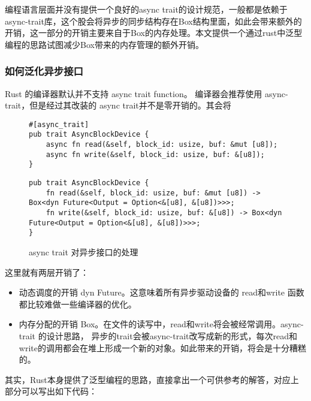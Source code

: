 编程语言层面并没有提供一个良好的async trait的设计规范，一般都是依赖于async-trait库，这个股会将异步的同步结构存在Box结构里面，如此会带来额外的开销，这一部分的开销主要来自于Box的内存处理。本文提供一个通过rust中泛型编程的思路试图减少Box带来的内存管理的额外开销。

\subsubsection*{如何泛化异步接口}

Rust 的编译器默认并不支持 async trait function。 编译器会推荐使用 async-trait，但是经过其改装的 async trait并不是零开销的。其会将


\begin{figure}[htbp]
    \figureCapSet
	\centering
	\begin{minipage}{0.49\linewidth}%
		\centering
        \begin{lstlisting}[frame=none]
#[async_trait]
pub trait AsyncBlockDevice {
    async fn read(&self, block_id: usize, buf: &mut [u8]);
    async fn write(&self, block_id: usize, buf: &[u8]);
}
        \end{lstlisting}
	\end{minipage}
    \hfill
	\begin{minipage}{0.49\linewidth}
		\centering
        \begin{lstlisting}[frame=none]
pub trait AsyncBlockDevice {
    fn read(&self, block_id: usize, buf: &mut [u8]) -> Box<dyn Future<Output = Option<&[u8], &[u8])>>>;
    fn write(&self, block_id: usize, buf: &[u8]) -> Box<dyn Future<Output = Option<&[u8], &[u8])>>>;
}
        \end{lstlisting}
	\end{minipage}
    \caption{async trait 对异步接口的处理}
\end{figure}


这里就有两层开销了：

\begin{itemize}
    \item 动态调度的开销 dyn Future。这意味着所有异步驱动设备的 read和write 函数都比较难做一些编译器的优化。
    \item 内存分配的开销 Box。在文件的读写中，read和write将会被经常调用。async-trait 的设计思路， 异步的trait会被async-trait改写成新的形式，每次read和write的调用都会在堆上形成一个新的对象。如此带来的开销，将会是十分糟糕的。
\end{itemize}
其实，Rust本身提供了泛型编程的思路，直接拿出一个可供参考的解答，对应上部分可以写出如下代码：


